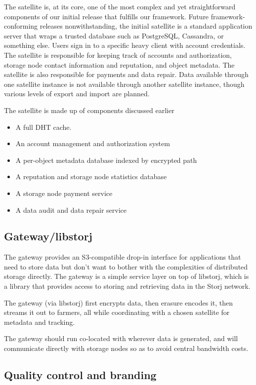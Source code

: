 \documentclass[a4paper,10pt]{article} \usepackage[utf8]{inputenc}
\begin{document}
The satellite is, at its core, one of the most complex and yet
straightforward components of our initial release that fulfills our framework.
Future framework-conforming releases nonwithstanding, the initial satellite
is a standard application server that wraps a trusted database such as
PostgreSQL, Cassandra, or something else. Users sign in to a specific heavy
client with account credentials. The satellite is responsible for
keeping track of accounts and authorization, storage node contact information 
and
reputation, and object metadata. The satellite is also responsible for
payments and data repair. Data available through one satellite instance is
not available through another satellite instance, though various levels of
export and import are planned.

The satellite is made up of components discussed earlier

\begin{itemize}
\item A full DHT cache.
\item An account management and authorization system
\item A per-object metadata database indexed by encrypted path
\item A reputation and storage node statistics database
\item A storage node payment service
\item A data audit and data repair service
\end{itemize}

\subsection{Gateway/libstorj}

The gateway provides an S3-compatible drop-in interface for applications that
need to store data but don't want to bother with the complexities of distributed
storage directly. The gateway is a simple service layer on top of libstorj,
which is a library that provides access to storing and retrieving data in the
Storj network.

The gateway (via libstorj) first encrypts data, then erasure encodes it, then
streams it out to farmers, all while coordinating with a chosen satellite
for metadata and tracking.

The gateway should run co-located with wherever data is generated, and will
communicate directly with storage nodes so as to avoid central bandwidth costs.

\subsection{Quality control and branding}
\end{document}
